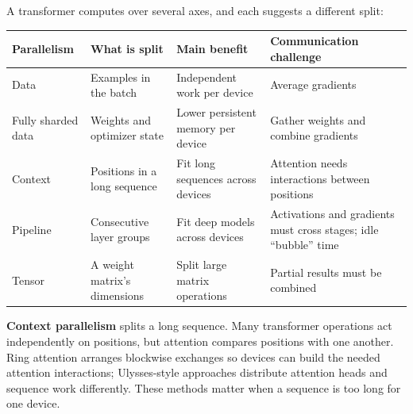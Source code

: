 A transformer computes over several axes, and each suggests a different split:

{\def\LTcaptype{none} %
\begin{longtable}[]{@{}
  >{\raggedright\arraybackslash}p{}
  >{\raggedright\arraybackslash}p{}
  >{\raggedright\arraybackslash}p{}
  >{\raggedright\arraybackslash}p{}@{}}
\toprule\noalign{}
\begin{minipage}[b]{\linewidth}\raggedright
Parallelism
\end{minipage} & \begin{minipage}[b]{\linewidth}\raggedright
What is split
\end{minipage} & \begin{minipage}[b]{\linewidth}\raggedright
Main benefit
\end{minipage} & \begin{minipage}[b]{\linewidth}\raggedright
Communication challenge
\end{minipage} \\
\midrule\noalign{}
\endhead
\bottomrule\noalign{}
\endlastfoot
Data & Examples in the batch & Independent work per device & Average gradients \\
Fully sharded data & Weights and optimizer state & Lower persistent memory per device & Gather weights and combine gradients \\
Context & Positions in a long sequence & Fit long sequences across devices & Attention needs interactions between positions \\
Pipeline & Consecutive layer groups & Fit deep models across devices & Activations and gradients must cross stages; idle ``bubble'' time \\
Tensor & A weight matrix's dimensions & Split large matrix operations & Partial results must be combined \\
\end{longtable}
}

\textbf{Context parallelism} splits a long sequence. Many transformer operations act independently on positions, but attention compares positions with one another. Ring attention arranges blockwise exchanges so devices can build the needed attention interactions; Ulysses-style approaches distribute attention heads and sequence work differently. These methods matter when a sequence is too long for one device.

